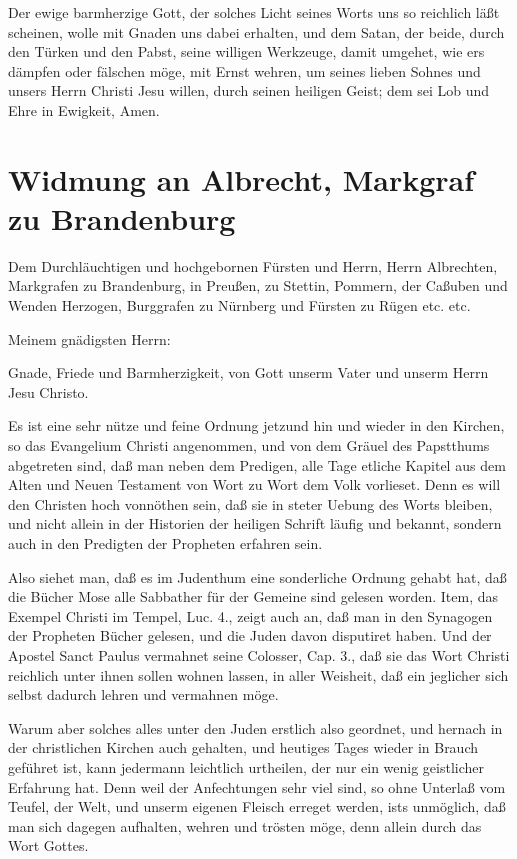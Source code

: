 Der ewige barmherzige Gott, der solches Licht seines Worts uns so reichlich läßt scheinen, wolle mit Gnaden uns dabei erhalten, und dem Satan, der beide, durch den Türken und den Pabst, seine willigen Werkzeuge, damit umgehet, wie ers dämpfen oder fälschen möge, mit Ernst wehren, um seines lieben Sohnes und unsers Herrn Christi Jesu willen, durch seinen heiligen Geist; dem sei Lob und Ehre in Ewigkeit, Amen.


\section{Widmung an Albrecht, Markgraf zu Brandenburg}

Dem Durchläuchtigen und hochgebornen Fürsten und Herrn, Herrn Albrechten, Markgrafen zu Brandenburg, in Preußen, zu Stettin, Pommern, der Caßuben und Wenden Herzogen, Burggrafen zu Nürnberg und Fürsten zu Rügen etc. etc.

Meinem gnädigsten Herrn:

Gnade, Friede und Barmherzigkeit, von Gott unserm Vater und unserm Herrn Jesu Christo.

Es ist eine sehr nütze und feine Ordnung jetzund hin und wieder in den Kirchen, so das Evangelium Christi angenommen, und von dem Gräuel des Papstthums abgetreten sind, daß man neben dem Predigen, alle Tage etliche Kapitel aus dem Alten und Neuen Testament von Wort zu Wort dem Volk vorlieset. Denn es will den Christen hoch vonnöthen sein, daß sie in steter Uebung des Worts bleiben, und nicht allein in der Historien der heiligen Schrift läufig und bekannt, sondern auch in den Predigten der Propheten erfahren sein.

Also siehet man, daß es im Judenthum eine sonderliche Ordnung gehabt hat, daß die Bücher Mose alle Sabbather für der Gemeine sind gelesen worden. Item, das Exempel Christi im Tempel, Luc. 4., zeigt auch an, daß man in den Synagogen der Propheten Bücher gelesen, und die Juden davon disputiret haben. Und der Apostel Sanct Paulus vermahnet seine Colosser, Cap. 3., daß sie das Wort Christi reichlich unter ihnen sollen wohnen lassen, in aller Weisheit, daß ein jeglicher sich selbst dadurch lehren und vermahnen möge.

Warum aber solches alles unter den Juden erstlich also geordnet, und hernach in der christlichen Kirchen auch gehalten, und heutiges Tages wieder in Brauch geführet ist, kann jedermann leichtlich urtheilen, der nur ein wenig geistlicher Erfahrung hat. Denn weil der Anfechtungen sehr viel sind, so ohne Unterlaß vom Teufel, der Welt, und unserm eigenen Fleisch erreget werden, ists unmöglich, daß man sich dagegen aufhalten, wehren und trösten möge, denn allein durch das Wort Gottes.


